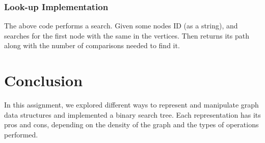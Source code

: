 \documentclass[12pt, letterpaper]{article}
\begin{document}
\subsubsection{Look-up Implementation}
\begin{center}
   
\end{center}
The above code performs a search.
Given some nodes ID (as a string), and searches for the first node with the same in the vertices.
Then returns its path along with the number of comparisons needed to find it.

\appendix
\section{Conclusion}
In this assignment, we explored different ways to represent and manipulate graph data structures and implemented a binary search tree.
Each representation has its pros and cons, depending on the density of the graph and the types of operations performed.
\end{document}
